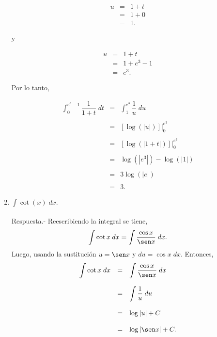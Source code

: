 \begin{enumerate}[\bfseries 1.]
	$$
	\begin{array}{rcl}
	    u &=& 1+t\\
	      &=& 1+0\\
	      &=&1.
	\end{array}
	$$

	\begin{center}
	y
	\end{center}

	$$
	\begin{array}{rcl}
	    u&=&1+t\\
	    &=&1+e^3-1\\
	    &=&e^3.
	\end{array}
	$$

	Por lo tanto,

	$$
	\begin{array}{rcl}
	    \displaystyle\int_0^{e^3-1}\dfrac{1}{1+t}\; dt&=&\displaystyle\int_1^{e^3}\dfrac{1}{u}\; du\\\\
							  &=&\left[\log(|u|)\right]\bigg|_0^{e^3}\\\\
							   &=&\left[\log(|1+t|)\right]\bigg|_0^{e^3}\\\\
							   &=&\log\left(|e^3|\right)-\log\left(|1|\right)\\\\
							   &=&3\log\left(|e|\right)\\\\
							   &=&3.
	\end{array}
	$$
	\vspace{.5cm}


    \item $\displaystyle\int \cot(x)\; dx$.\\\\
	Respuesta.-\; Reescribiendo la integral se tiene,
	$$\int \cot x \; dx = \int \dfrac{\cos x}{\sen x}\; dx.$$
	Luego, usando la sustitución $u=\sen x$ y $du=\cos x\; dx$. Entonces,
	$$
	\begin{array}{rcl}
	    \displaystyle\int \cot x \; dx &=& \displaystyle\int \dfrac{\cos x}{\sen x}\; dx\\\\
					   &=& \displaystyle\int \dfrac{1}{u}\; du\\\\
					   &=& \log|u|+C\\\\
					   &=& \log|\sen x|+C.
	\end{array}
	$$
	\vspace{.5cm}


\end{enumerate}

